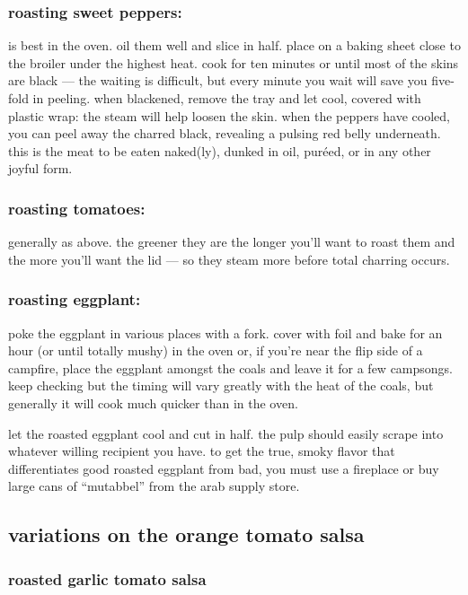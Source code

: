 \subsubsection{roasting sweet peppers:}
is best in the oven. oil them well and slice in half. place on a baking sheet 
close to the broiler under the highest heat. cook for ten minutes or until 
most of the skins are black --- the waiting is difficult, but every minute you 
wait will save you five-fold in peeling. when blackened, remove the tray and 
let cool, covered with plastic wrap: the steam will help loosen the skin. when 
the peppers have cooled, you can peel away the charred black, revealing a 
pulsing red belly underneath. this is the meat to be eaten naked(ly), dunked 
in oil, pur\'{e}ed, or in any other joyful form.

\subsubsection{roasting tomatoes:}
generally as above. the greener they are the longer you'll want to roast them 
and the more you'll want the lid --- so they steam more before total charring 
occurs.

\subsubsection{roasting eggplant:}
poke the eggplant in various places with a fork. cover with foil and bake for 
an hour (or until totally mushy) in the oven or, if you're near the flip side 
of a campfire, place the eggplant amongst the coals and leave it for a few 
campsongs. keep checking but the timing will vary greatly with the heat of the 
coals, but generally it will cook much quicker than in the oven.

let the roasted eggplant cool and cut in half. the pulp should easily scrape 
into whatever willing recipient you have. to get the true, smoky flavor that 
differentiates good roasted eggplant from bad, you must use a fireplace or buy 
large cans of ``\gls{mutabbel}'' from the arab supply store.

\subsection{variations on the orange tomato salsa}

\subsubsection{roasted garlic tomato salsa}

